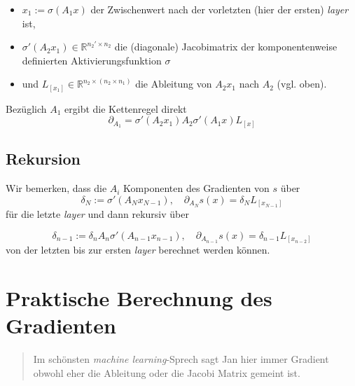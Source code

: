 \documentclass[
]{book}
\providecommand{\tightlist}{%
  \setlength{\itemsep}{0pt}\setlength{\parskip}{0pt}}
\newenvironment {JHSAYS} [0] {\begin{quote}\color{jhsc}} {\end{quote}}
\theoremstyle{definition}
\theoremstyle{definition}
\theoremstyle{definition}
\theoremstyle{definition}
\theoremstyle{remark}
\begin{document}
\begin{itemize}
\tightlist
\item
  \(x_1:=\sigma(A_1x)\) der Zwischenwert nach der vorletzten (hier der ersten) \emph{layer} ist,
\item
  \(\sigma'(A_2x_1)\in \mathbb R^{n_2'\times n_2}\) die (diagonale) Jacobimatrix der komponentenweise definierten Aktivierungsfunktion \(\sigma\)
\item
  und \(L_{[x_1]}\in \mathbb R^{n_2\times (n_2\times n_1)}\) die Ableitung von \(A_2x_1\) nach \(A_2\) (vgl. oben).
\end{itemize}

Bezüglich \(A_1\) ergibt die Kettenregel direkt
\begin{equation*}
\partial_{A_1} = \sigma'(A_2x_1)A_2\sigma'(A_1x)L_{[x]}
\end{equation*}

\hypertarget{rekursion}{%
\subsection{Rekursion}\label{rekursion}}

Wir bemerken, dass die \(A_i\) Komponenten des Gradienten von \(s\) über
\begin{equation*}
\delta_N := \sigma'(A_Nx_{N-1}), \quad \partial_{A_N} s(x) = \delta_N L_{[x_{N-1}]}
\end{equation*}
für die letzte \emph{layer} und dann rekursiv über

\begin{equation*}
\delta_{n-1} := \delta_nA_n\sigma'(A_{n-1}x_{n-1}), \quad \partial_{A_{n-1}} s(x) = \delta_{n-1} L_{[x_{n-2}]}
\end{equation*}
von der letzten bis zur ersten \emph{layer} berechnet werden können.

\hypertarget{praktische-berechnung-des-gradienten}{%
\section{Praktische Berechnung des Gradienten}\label{praktische-berechnung-des-gradienten}}

\leavevmode{}%
\begin{JHSAYS}
Im schönsten \emph{machine learning}-Sprech sagt Jan hier immer Gradient obwohl
eher die Ableitung oder die Jacobi Matrix gemeint ist.

\end{JHSAYS}
\end{document}
